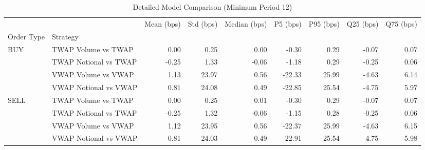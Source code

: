 \begin{table}
\caption{Detailed Model Comparison (Minimum Period 12)}
\label{tab:detailed_min_period_12}
\begin{tabular}{l|l|rrrrrrr}
\toprule
 &  & Mean (bps) & Std (bps) & Median (bps) & P5 (bps) & P95 (bps) & Q25 (bps) & Q75 (bps) \\
Order Type & Strategy &  &  &  &  &  &  &  \\
\midrule
\multirow[t]{4}{*}{BUY} & TWAP Volume vs TWAP & 0.00 & 0.25 & 0.00 & -0.30 & 0.29 & -0.07 & 0.07 \\
 & TWAP Notional vs TWAP & -0.25 & 1.33 & -0.06 & -1.18 & 0.29 & -0.25 & 0.06 \\
 & VWAP Volume vs VWAP & 1.13 & 23.97 & 0.56 & -22.33 & 25.99 & -4.63 & 6.14 \\
 & VWAP Notional vs VWAP & 0.81 & 24.08 & 0.49 & -22.85 & 25.54 & -4.75 & 5.97 \\
\cline{1-9}
\multirow[t]{4}{*}{SELL} & TWAP Volume vs TWAP & 0.00 & 0.25 & 0.01 & -0.30 & 0.29 & -0.07 & 0.07 \\
 & TWAP Notional vs TWAP & -0.25 & 1.32 & -0.06 & -1.15 & 0.28 & -0.25 & 0.06 \\
 & VWAP Volume vs VWAP & 1.12 & 23.95 & 0.56 & -22.37 & 25.99 & -4.63 & 6.15 \\
 & VWAP Notional vs VWAP & 0.81 & 24.03 & 0.49 & -22.91 & 25.54 & -4.75 & 5.98 \\
\cline{1-9}
\bottomrule
\end{tabular}
\end{table}
